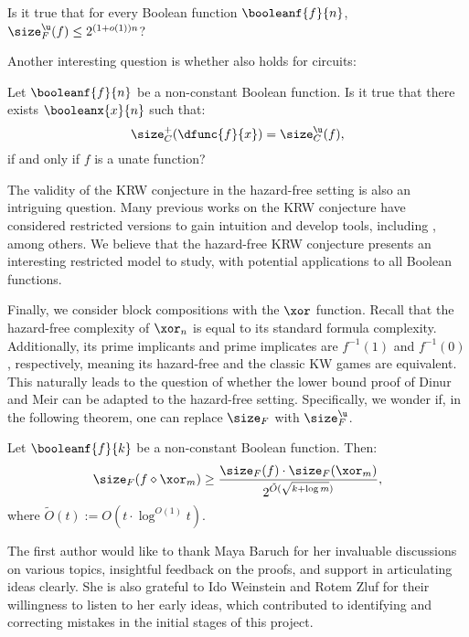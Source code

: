 \documentclass[acmsmall, nonacm, authorversion]{acmart}
\begin{document}
\begin{question}
    Is it true that for every Boolean function $\booleanf{f}{n}$, $\size_{F}^\u (f) \leq 2^{(1+o(1))n}$?
\end{question}

Another interesting question is whether  also holds for circuits:

\begin{question}
    Let $\booleanf{f}{n}$ be a non-constant Boolean function. Is it true that there exists $\booleanx{x}{n}$ such that:
\[
    \size_{C}^{+}(\dfunc{f}{x}) = \size_{C}^{\u}(f),
\]
if and only if $f$ is a unate function?
\end{question}

The validity of the KRW conjecture in the hazard-free setting is also an intriguing question. Many previous works on the KRW conjecture have considered restricted versions to gain intuition and develop tools, including \cite{KRW95, hw92, EIRS01, GMWW17, km18, Mei20}, among others. We believe that the hazard-free KRW conjecture presents an interesting restricted model to study, with potential applications to all Boolean functions.

\conjhazardfreekrw*

Finally, we consider block compositions with the $\xor$ function. Recall that the hazard-free complexity of $\xor_n$ is equal to its standard formula complexity. Additionally, its prime implicants and prime implicates are $f^{-1}(1)$ and $f^{-1}(0)$, respectively, meaning its hazard-free and the classic KW games are equivalent. This naturally leads to the question of whether the lower bound proof of Dinur and Meir  \cite{DM18} can be adapted to the hazard-free setting.
Specifically, we wonder if, in the following theorem, one can replace $\size_F$ with $\size_F^{\u}$.

\begin{theorem}\label{thm:parity-composition}
Let $\booleanf{f}{k}$ be a non-constant Boolean function. Then:
\[
\size_F(f\diamond \xor_m)\ge \frac{\size_F(f)\cdot \size_F(\xor_m)}{2^{\tilde{O}(\sqrt{k+\log m})}},
\]
where $\tilde{O}(t):=O(t\cdot \log^{O(1)}t)$. 
\end{theorem}

\begin{acks}
The first author would like to thank Maya Baruch for her invaluable discussions on various topics, insightful feedback on the proofs, and support in articulating ideas clearly. She is also grateful to Ido Weinstein and Rotem Zluf for their willingness to listen to her early ideas, which contributed to identifying and correcting mistakes in the initial stages of this project.
\end{acks}



\end{document}

